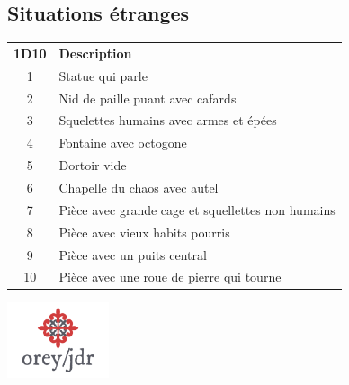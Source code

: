 \documentclass[a4paper, 11pt, twoside]{article}
\begin{document}
\subsection{Situations étranges}
\label{sec:org875209c}

\begin{longtable}{cl}
\textbf{1D10} & \textbf{Description}\\
1 & Statue qui parle\\
2 & Nid de paille puant avec cafards\\
3 & Squelettes humains avec armes et épées\\
4 & Fontaine avec octogone\\
5 & Dortoir vide\\
6 & Chapelle du chaos avec autel\\
7 & Pièce avec grande cage et squellettes non humains\\
8 & Pièce avec vieux habits pourris\\
9 & Pièce avec un puits central\\
10 & Pièce avec une roue de pierre qui tourne\\
\end{longtable}

\vfill

\begin{center}
\includegraphics[width=3cm]{logo-orey-big.png}
\end{center}
\end{document}
